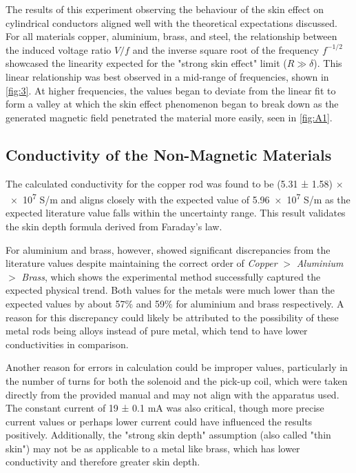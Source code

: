 \documentclass[11pt, a4paper, twocolumn]{article}
\begin{document}
The results of this experiment observing the behaviour of the skin effect on cylindrical conductors aligned well with the theoretical expectations discussed. For all materials copper, aluminium, brass, and steel, the relationship between the induced voltage ratio $V/f$ and the inverse square root of the frequency $f^{-1/2}$ showcased the linearity expected for the "strong skin effect" limit ($R \gg \delta$). This linear relationship was best observed in a mid-range of frequencies, shown in \autoref{fig:3}. At higher frequencies, the values began to deviate from the linear fit to form a valley at which the skin effect phenomenon began to break down as the generated magnetic field penetrated the material more easily, seen in \autoref{fig:A1}.

\subsection{Conductivity of the Non-Magnetic Materials}

The calculated conductivity for the copper rod was found to be (5.31 ± 1.58) $\times$\num{e7} S/m and aligns closely with the expected value of \num{5.96e7} S/m as the expected literature value falls within the uncertainty range. This result validates the skin depth formula derived from Faraday's law.

For aluminium and brass, however, showed significant discrepancies from the literature values despite maintaining the correct order of \textit{Copper} $>$ \textit{Aluminium} $>$ \textit{Brass}, which shows the experimental method successfully captured the expected physical trend. Both values for the metals were much lower than the expected values by about 57\% and 59\% for aluminium and brass respectively. A reason for this discrepancy could likely be attributed to the possibility of these metal rods being alloys instead of pure metal, which tend to have lower conductivities in comparison.

Another reason for errors in calculation could be improper values, particularly in the number of turns for both the solenoid and the pick-up coil, which were taken directly from the provided manual and may not align with the apparatus used. The constant current of 19 ± 0.1 mA was also critical, though more precise current values or perhaps lower current could have influenced the results positively. Additionally, the "strong skin depth" assumption (also called "thin skin") may not be as applicable to a metal like brass, which has lower conductivity and therefore greater skin depth.
\end{document}
